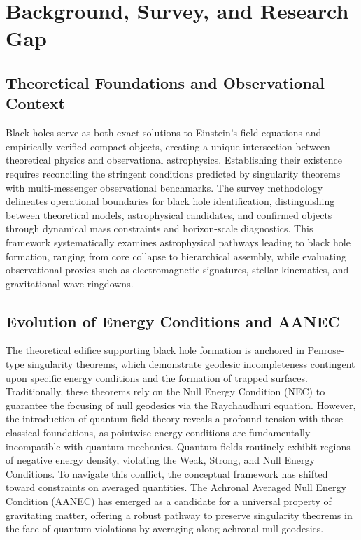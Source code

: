\documentclass[conference]{IEEEtran}
\begin{document}
\section{Background, Survey, and Research Gap}
\subsection{Theoretical Foundations and Observational Context}
Black holes serve as both exact solutions to Einstein's field equations and empirically verified compact objects, creating a unique intersection between theoretical physics and observational astrophysics. Establishing their existence requires reconciling the stringent conditions predicted by singularity theorems with multi-messenger observational benchmarks. The survey methodology delineates operational boundaries for black hole identification, distinguishing between theoretical models, astrophysical candidates, and confirmed objects through dynamical mass constraints and horizon-scale diagnostics. This framework systematically examines astrophysical pathways leading to black hole formation, ranging from core collapse to hierarchical assembly, while evaluating observational proxies such as electromagnetic signatures, stellar kinematics, and gravitational-wave ringdowns.

\subsection{Evolution of Energy Conditions and AANEC}
The theoretical edifice supporting black hole formation is anchored in Penrose-type singularity theorems, which demonstrate geodesic incompleteness contingent upon specific energy conditions and the formation of trapped surfaces. Traditionally, these theorems rely on the Null Energy Condition (NEC) to guarantee the focusing of null geodesics via the Raychaudhuri equation. However, the introduction of quantum field theory reveals a profound tension with these classical foundations, as pointwise energy conditions are fundamentally incompatible with quantum mechanics. Quantum fields routinely exhibit regions of negative energy density, violating the Weak, Strong, and Null Energy Conditions. To navigate this conflict, the conceptual framework has shifted toward constraints on averaged quantities. The Achronal Averaged Null Energy Condition (AANEC) has emerged as a candidate for a universal property of gravitating matter, offering a robust pathway to preserve singularity theorems in the face of quantum violations by averaging along achronal null geodesics.
\end{document}
